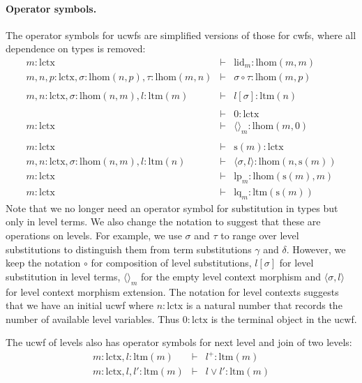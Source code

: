 \documentclass[11pt,a4paper]{article}
\theoremstyle{plain}
\theoremstyle{definition}
\def\lhom{\mathrm{lhom}}
\def\lctx{\mathrm{lctx}}
\def\ltm{\mathrm{ltm}}
\def\lp{\mathrm{lp}}
\def\lq{\mathrm{lq}}
\def\s{\mathrm{s}}
\def\lid{\mathrm{lid}}
\def\cp{\mathrm{cp}}
\def\cq{\mathrm{cq}}
\newcommand{\tuple}[1]{\langle #1 \rangle}
\begin{document}
\paragraph{Operator symbols.} The operator symbols for ucwfs are simplified versions of those for cwfs, where all dependence on types is removed:
\begin{eqnarray*}
m : \lctx &\vdash& \lid_m : \lhom(m,m)\\
m, n, p : \lctx, \sigma : \lhom(n,p), \tau : \lhom(m,n) &\vdash&
\sigma \circ \tau : \lhom(m,p)\\
\\
m,n: \lctx, \sigma : \lhom(n,m), l :\ltm(m) &\vdash&  l[\sigma] : \ltm(n)\\
\\
&\vdash& 0 : \lctx\\
m : \lctx &\vdash& \tuple{}_m : \lhom(m,0)\\
\\
m : \lctx &\vdash& \s(m) : \lctx\\
m,n : \lctx, \sigma : \lhom(n,m), l:\ltm(n) &\vdash& \tuple{\sigma,l} : \lhom(n,\s(m))\\
m : \lctx &\vdash& \lp_m: \lhom(\s(m),m)\\
m : \lctx &\vdash& \lq_m: \ltm(\s(m))
\end{eqnarray*}
Note that we no longer need an operator symbol for substitution in types but only in level terms. We also change the notation to suggest that these are operations on levels. For example, we use $\sigma$ and $\tau$ to range over level substitutions to distinguish them from term substitutions $\gamma$ and $\delta$. However, we keep the notation $\circ$ for composition of level substitutions, $l[\sigma]$ for level substitution in level terms, $\tuple{}_m$ for the empty level context morphism and $\tuple{\sigma,l}$ for level context morphism extension. The notation for level contexts suggests that we have an initial ucwf where $n : \lctx$ is a natural number that records the number of available level variables. Thus $0 : \lctx$ is the terminal object in the ucwf.

The ucwf of levels also has operator symbols for next level and join of two levels:
\begin{eqnarray*}
m : \lctx, l : \ltm(m) &\vdash& l^+ : \ltm(m)\\
m : \lctx, l,l' : \ltm(m) &\vdash& l \vee l' : \ltm(m)
\end{eqnarray*}
\end{document}
